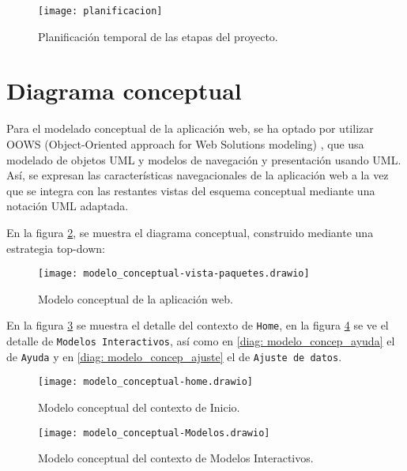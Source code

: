 \begin{figure}[!h]
\begin{center}
\caption{Planificación temporal de las etapas del proyecto.}
\label{fig: planificacion}
\texttt{[image: planificacion]}
\end{center}
\end{figure}


\section{Diagrama conceptual}

Para el modelado conceptual de la aplicación web, se ha optado por utilizar OOWS (Object-Oriented approach for Web Solutions modeling) \cite{pastorobject}, que usa modelado de objetos UML y modelos de navegación y presentación usando UML. Así, se expresan las características navegacionales de la aplicación web a la vez que se integra con las restantes vistas del esquema conceptual mediante una notación UML adaptada.

En la figura \ref{diag: modelo_concep}, se muestra el diagrama conceptual, construido mediante una estrategia top-down:

\begin{figure}[!h]
\begin{center}
\caption{Modelo conceptual de la aplicación web.}
\label{diag: modelo_concep}
\texttt{[image: modelo\_conceptual-vista-paquetes.drawio]}
\end{center}
\end{figure}

En la figura \ref{diag: modelo_concep_home} se muestra el detalle del contexto de \verb|Home|, en la figura \ref{diag: modelo_concep_modelos} se ve el detalle de \verb|Modelos Interactivos|, así como en \ref{diag: modelo_concep_ayuda} el de \verb|Ayuda| y en \ref{diag: modelo_concep_ajuste} el de \verb|Ajuste de datos|.

\begin{figure}[!h]
\begin{center}
\caption{Modelo conceptual del contexto de Inicio.}
\label{diag: modelo_concep_home}
\texttt{[image: modelo\_conceptual-home.drawio]}
\end{center}
\end{figure}

\begin{figure}[!h]
\begin{center}
\caption{Modelo conceptual del contexto de Modelos Interactivos.}
\label{diag: modelo_concep_modelos}
\texttt{[image: modelo\_conceptual-Modelos.drawio]}
\end{center}
\end{figure}

